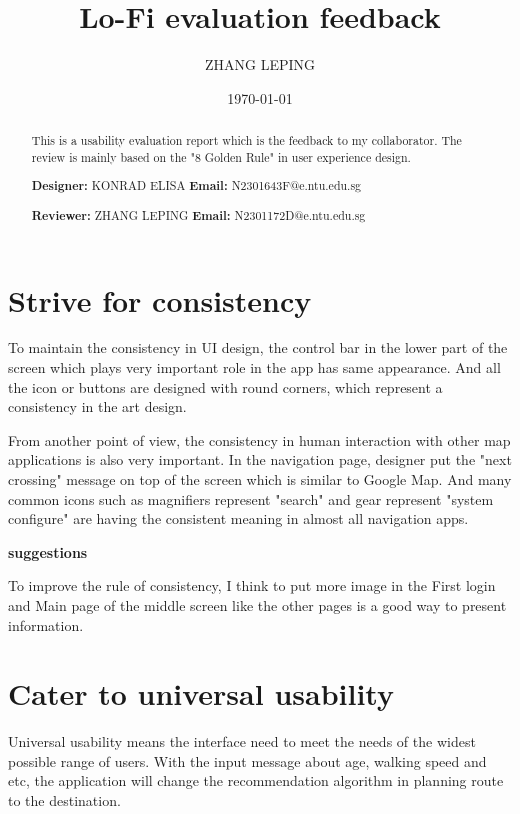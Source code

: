 \documentclass{article}
\title{Lo-Fi evaluation feedback}
\author{ZHANG LEPING}
\date{\today}
\begin{document}
	\maketitle
	
	\begin{abstract}
		This is a usability evaluation report which is the feedback to my collaborator.
		The review is mainly based on the "8 Golden Rule" in user experience design.
		
		\noindent\textbf{Designer: }KONRAD ELISA \qquad
		\textbf{Email: }N2301643F@e.ntu.edu.sg
		
		\noindent\textbf{Reviewer: }ZHANG LEPING \qquad
		\textbf{Email: }N2301172D@e.ntu.edu.sg
		
		
	\end{abstract}
	
	\section{Strive for consistency}
	
	To maintain the consistency in UI design, the control bar in the lower part of the screen which plays very important role in the app has same appearance. And all the icon or buttons
	are designed with round corners, which represent a consistency in the art design.
	
	From another point of view, the consistency in human interaction with other map applications is also very important. In the navigation page, designer put the "next crossing" message on top of the screen which is similar to Google Map. And many common icons such as magnifiers represent "search" and gear represent "system configure" are having the consistent meaning in almost all navigation apps.
	
	\textbf{suggestions}
	
	To improve the rule of consistency, I think to put more image in the First login and Main page of the middle screen like the other pages is a good way to present information.
	 
	\section{Cater to universal usability}
	
	Universal usability means the interface need to meet the needs of the widest possible range of users.
	With the input message about age, walking speed and etc, the application will change the recommendation
	algorithm in planning route to the destination. 
	
\end{document}
